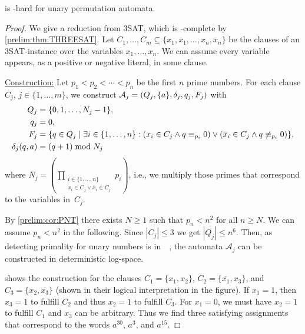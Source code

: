 \begin{proposition}
	\label{compl:prop:dfaint_unary}
	\DFAINT is \NP-hard for unary permutation automata.
\end{proposition}
\begin{proof}	
	We give a reduction from {\sc 3SAT}, which 
	is \NP-complete by \cref{prelim:thm:THREESAT}.
	Let $C_1, \ldots, C_m \subseteq \{x_1, \overline x_1, \ldots, x_n, \overline x_n\}$ 
	be the clauses of an {\sc 3SAT}-instance over the variables $x_1, \ldots, x_n$.
	We can assume every variable appears, as a positive or negative literal, in some clause.
	
	\medskip 
	\noindent\underline{Construction:} 
	Let $p_1 < p_2 < \cdots < p_n$
	be the first $n$ prime numbers.
	For each clause $C_j$, $j \in \{1,\ldots,m\}$,
	we construct 
	$\mathcal A_j = (Q_j, \{a\}, \delta_j, q_j, F_j)$
	with
	\begin{align*}
		Q_j & = \{0,1,\ldots, N_j - 1\}, \\
		q_j & = 0, \\
		F_j & = \{ q \in Q_j \mid \exists i \in \{1,\ldots,n\} : 
		( x_i \in C_j \land q \equiv_{p_i} 0 ) \lor ( \overline{x}_i \in C_j \land q \not\equiv_{p_i} 0 ) \}, \\
		\delta_j(q,a) & = (q + 1) \bmod{ N_j }
	\end{align*}
	where $N_j = \left(\prod_{\substack{ i \in \{1,\ldots,n\} \\ x_i \in C_j \lor \overline{x}_i \in C_j}} p_i \right)$,
	i.e., we multiply those primes that correspond
	to the variables in~$C_j$.
	
	By \cref{prelim:cor:PNT} 
	there exists $N \ge 1$ such that $p_n < n^2$
	for all $n \ge N$.
	We can assume $p_n < n^2$ in the following.
	Since  $|C_j| \le 3$
	we get  $|Q_j| \le n^6$.
	Then, as detecting primality for unary numbers
	is in~\LOGSPACE~\cite[Thm.~7]{DBLP:journals/tcs/HartmanisB76},
	the automata $\mathcal A_j$ can be constructed 
	in deterministic log-space.	
	
	shows the construction for the clauses $C_1 = \{ x_1, x_2\}$, $C_2 = \{ \overline{x_1}, x_3\}$,
	and $C_3 = \{ x_2, \overline{x_3}\}$ (shown in their logical interpretation
	in the figure).
	If $x_1 = 1$, then $x_3 = 1$ to fulfill $C_2$
	and thus $x_2 = 1$ to fulfill $C_3$. For $x_1 = 0$,
	we must have $x_2 = 1$ to fulfill $C_1$
	and $x_3$ can be arbitrary. Thus we find 
	three satisfying assignments that correspond to 
	the words $a^{30}$, $a^3$, and $a^{15}$.	
	

\end{proof}

